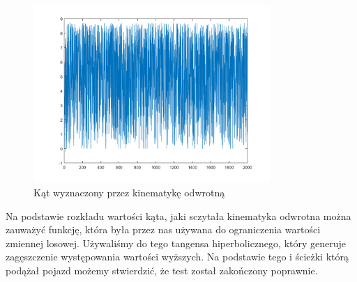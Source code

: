 \documentclass[a4paper, 12pt]{report}
\begin{document}
				\begin{figure}[H]
					\centering
					\includegraphics[width = 0.8\textwidth]{./AP/img/random_right_in_3.png}
					\caption{Kąt wyznaczony przez kinematykę odwrotną}
				\end{figure}
				\noindent Na podstawie rozkładu wartości kąta, jaki sczytała kinematyka odwrotna można zauważyć funkcję, która była przez nas używana do ograniczenia wartości zmiennej losowej. Używaliśmy do tego tangensa hiperbolicznego, który generuje zagęszczenie występowania wartości wyższych. Na podstawie tego i ścieżki którą podążał pojazd możemy stwierdzić, że test został zakończony poprawnie.
			\newpage
\end{document}
